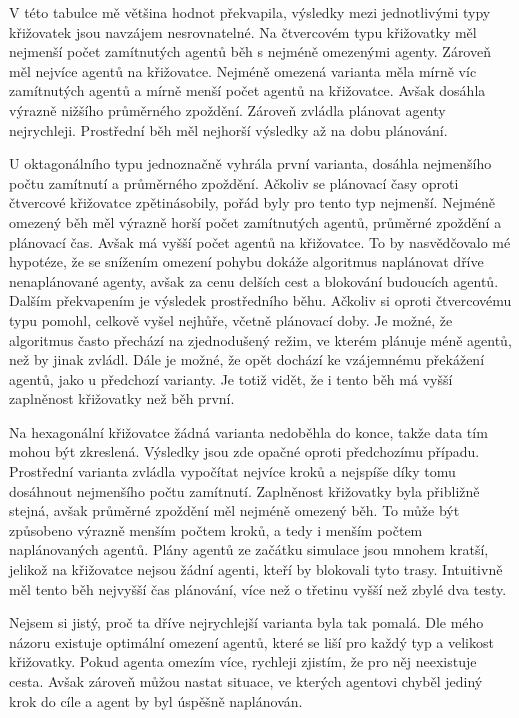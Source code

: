 V této tabulce mě většina hodnot překvapila, výsledky mezi jednotlivými typy křižovatek jsou navzájem nesrovnatelné.
Na čtvercovém typu křižovatky měl nejmenší počet zamítnutých agentů běh s nejméně omezenými agenty.
Zároveň měl nejvíce agentů na křižovatce.
Nejméně omezená varianta měla mírně víc zamítnutých agentů a mírně menší počet agentů na křižovatce.
Avšak dosáhla výrazně nižšího průměrného zpoždění.
Zároveň zvládla plánovat agenty nejrychleji.
Prostřední běh měl nejhorší výsledky až na dobu plánování.

U oktagonálního typu jednoznačně vyhrála první varianta,
dosáhla nejmenšího počtu zamítnutí a průměrného zpoždění.
Ačkoliv se plánovací časy oproti čtvercové křižovatce zpětinásobily, pořád byly pro tento typ nejmenší.
Nejméně omezený běh měl výrazně horší počet zamítnutých agentů, průměrné zpoždění a plánovací čas.
Avšak má vyšší počet agentů na křižovatce.
To by nasvědčovalo mé hypotéze, že se snížením omezení pohybu dokáže algoritmus naplánovat dříve nenaplánované agenty,
avšak za cenu delších cest a blokování budoucích agentů.
Dalším překvapením je výsledek prostředního běhu.
Ačkoliv si oproti čtvercovému typu pomohl, celkově vyšel nejhůře, včetně plánovací doby.
Je možné, že algoritmus často přechází na zjednodušený režim, ve kterém plánuje méně agentů, než by jinak zvládl.
Dále je možné, že opět dochází ke vzájemnému překážení agentů, jako u předchozí varianty.
Je totiž vidět, že i tento běh má vyšší zaplněnost křižovatky než běh první.

Na hexagonální křižovatce žádná varianta nedoběhla do konce, takže data tím mohou být zkreslená.
Výsledky jsou zde opačné oproti předchozímu případu.
Prostřední varianta zvládla vypočítat nejvíce kroků a nejspíše díky tomu dosáhnout nejmenšího počtu zamítnutí.
Zaplněnost křižovatky byla přibližně stejná, avšak průměrné zpoždění měl nejméně omezený běh.
To může být způsobeno výrazně menším počtem kroků, a tedy i menším počtem naplánovaných agentů.
Plány agentů ze začátku simulace jsou mnohem kratší,
jelikož na křižovatce nejsou žádní agenti, kteří by blokovali tyto trasy.
Intuitivně měl tento běh nejvyšší čas plánování, více než o třetinu vyšší než zbylé dva testy.

Nejsem si jistý, proč ta dříve nejrychlejší varianta byla tak pomalá.
Dle mého názoru existuje optimální omezení agentů, které se liší pro každý typ a velikost křižovatky.
Pokud agenta omezím více, rychleji zjistím, že pro něj neexistuje cesta.
Avšak zároveň můžou nastat situace, ve kterých agentovi chyběl jediný krok do cíle
a agent by byl úspěšně naplánován.

